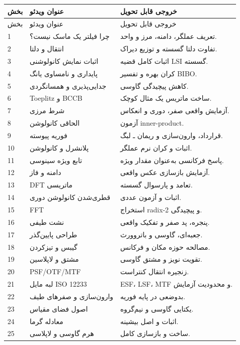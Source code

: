 \begin{videobox}
\begin{longtable}{p{}p{}p{}}
\toprule
بخش & عنوان ویدئو & خروجی قابل تحویل\\
\midrule
\endfirsthead
\toprule
بخش & عنوان ویدئو & خروجی قابل تحویل\\
\midrule
\endhead
1 & چرا فیلتر یک ماسک نیست؟ & تعریف عملگر، دامنه، مرز و واحد.\\
2 & انتقال و دلتا & تفاوت دلتا گسسته و توزیع دیراک.\\
3 & اثبات نمایش کانولوشنی & اثبات کامل قضیه LSI گسسته.\\
4 & پایداری و نامساوی یانگ & کران بهره و تفسیر BIBO.\\
5 & جدایی‌پذیری و همسانگردی & کاهش پیچیدگی گاوسی.\\
6 & Toeplitz و BCCB & ساخت ماتریس یک مثال کوچک.\\
7 & شرط مرزی & آزمایش واقعی صفر، دوری و انعکاس.\\
8 & الحاقی کانولوشن & آزمون inner-product.\\
9 & فوریه پیوسته & قرارداد، وارون‌سازی و ریمان ـ لبگ.\\
10 & پلانشرل و کانولوشن & اثبات و کران نرم عملگر.\\
11 & تابع ویژه سینوسی & پاسخ فرکانسی به‌عنوان مقدار ویژه.\\
12 & دامنه و فاز & آزمایش بازسازی عکس واقعی.\\
13 & DFT ماتریسی & تعامد و پارسوال گسسته.\\
14 & قطری‌شدن کانولوشن دوری & اثبات و آزمون عددی.\\
15 & FFT & استخراج radix-2 و پیچیدگی.\\
16 & نشت طیفی & پنجره، پد صفر و تفکیک واقعی.\\
17 & طراحی پایین‌گذر & جعبه‌ای، گاوسی و باتروورث.\\
18 & گیبس و تیزکردن & مصالحه حوزه مکان و فرکانس.\\
19 & مشتق و لاپلاسین & تقویت نویز و مشتق گاوسی.\\
20 & PSF/OTF/MTF & زنجیره انتقال کنتراست.\\
21 & لبه مایل ISO 12233 & ESF، LSF، MTF و محدودیت آزمایش.\\
22 & وارون‌سازی و صفرهای طیف & بدوضعی در پایه فوریه.\\
23 & اصول فضای مقیاس & یکتایی گاوسی و نیم‌گروه.\\
24 & معادله گرما & اثبات و اصل بیشینه.\\
25 & هرم گاوسی و لاپلاسی & ساخت و بازسازی کامل.\\

\end{longtable}
\end{videobox}
